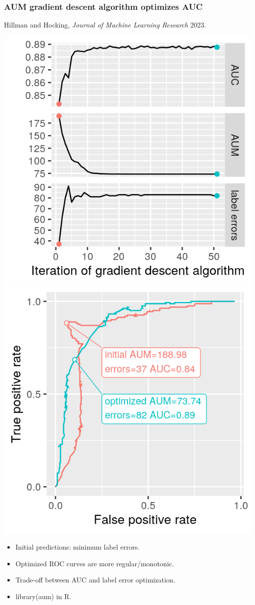\documentclass{beamer}
\begin{document}
\begin{frame}
  \frametitle{AUM gradient descent algorithm optimizes AUC}
  
  Hillman and Hocking, \emph{Journal of Machine Learning Research} 2023.

  \includegraphics[width=0.49\linewidth]{figure-aum-optimized-iterations-emph}
  \includegraphics[width=0.49\linewidth]{figure-aum-train-pred-only} 

  \begin{itemize}
  \item Initial predictions: minimum label errors.
  \item Optimized ROC curves are more regular/monotonic.
  \item Trade-off between AUC and label error optimization.
  \item library(aum) in R.
  \end{itemize}
\end{frame}

 
\end{document}
